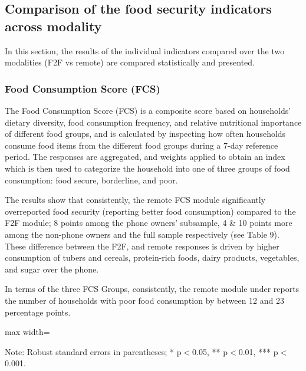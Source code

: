 \documentclass[11pt,harvard]{article}
\begin{document}
\subsection{Comparison of the food security indicators across modality} 
In this section, the results of the individual indicators compared over the two modalities (F2F vs remote) are compared statistically and presented.

\subsubsection{Food Consumption Score (FCS)}
	
The Food Consumption Score (FCS) is a composite score based on households’ dietary diversity, food consumption frequency, and relative nutritional importance of different food groups, and is calculated by inspecting how often households consume food items from the different food groups during a 7-day reference period. The responses are aggregated, and weights applied to obtain an index which is then used to categorize the household into one of three groups of food consumption: food secure, borderline, and poor.

The results show that consistently, the remote FCS module significantly overreported food security (reporting better food consumption) compared to the F2F module; 8 points among the phone owners' subsample, 4 \& 10 points more among the non-phone owners and the full sample respectively (see Table 9). These difference between the F2F, and remote responses is driven by higher consumption of tubers and cereals, protein-rich foods, dairy products, vegetables, and sugar over the phone. 

In terms of the three FCS Groups, consistently, the remote module under reports the number of households with poor food consumption by between 12 and 23 percentage points.
	
	\begin{table}[htbp]
		\centering
		\begin{adjustbox}{max width=\textwidth}
			\begin{threeparttable}
				\caption{Impact of Survey Modality on Food Consumption Score and Groups}
				\scriptsize
				 
				\label{tab:FCS_Modality_CAR}
				\begin{tablenotes}
					\item Note: Robust standard errors in parentheses; * p$<$0.05, ** p$<$0.01, *** p$<$0.001.
				\end{tablenotes}
			\end{threeparttable}
		\end{adjustbox}
	\end{table}
	
\end{document}

